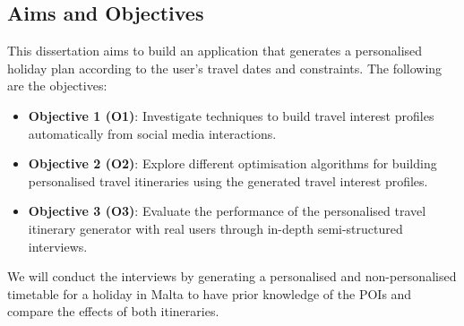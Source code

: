 
\subsection{Aims and Objectives}

This dissertation aims to build an application that
generates a personalised holiday plan according to the
user's travel dates and constraints. The following are the objectives:


\begin{itemize}
    \item \textbf{Objective 1 (O1)}: Investigate techniques to build travel interest
    profiles automatically from social media interactions.  
    \item \textbf{Objective 2 (O2)}: Explore different optimisation algorithms for
    building personalised travel itineraries using the
    generated travel interest profiles. 
    \item \textbf{Objective 3 (O3)}: Evaluate the
    performance of the personalised travel itinerary
    generator with real users through in-depth
    semi-structured interviews. 

\end{itemize}

We will conduct the interviews by generating a
personalised and non-personalised timetable for a
holiday in Malta to have prior knowledge of the POIs
and compare the effects of both itineraries.


